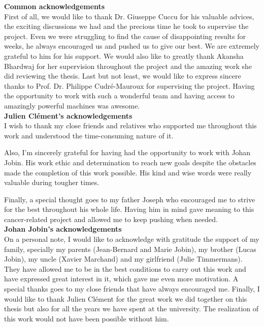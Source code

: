 
\textbf{Common acknowledgements}\\
First of all, we would like to thank Dr. Giuseppe Cuccu for his valuable advices, the exciting discussions we had and the precious time he took to supervise the project. Even we were struggling to find the cause of disappointing results for weeks, he always encouraged us and pushed us to give our best. We are extremely grateful to him for his support. We would also like to greatly thank Akansha Bhardwaj for her supervision throughout the project and the amazing work she did reviewing the thesis. Last but not least, we would like to express sincere thanks to Prof. Dr. Philippe Cudré-Mauroux for supervising the project. Having the opportunity to work with such a wonderful team and having access to amazingly powerful machines was awesome.\\

\noindent \textbf{Julien Clément's acknowledgements}\\
I wish to thank my close friends and relatives who supported me throughout this work and understood the time-consuming nature of it. 

\noindent Also, I’m sincerely grateful for having had the opportunity to work with Johan Jobin. His work ethic and determination to reach new goals despite the obstacles made the completion of this work possible. His kind and wise words were really valuable during tougher times. 

\noindent Finally, a special thought goes to my father Joseph who encouraged me to strive for the best throughout his whole life. Having him in mind gave meaning to this cancer-related project and allowed me to keep pushing when needed.\\

\noindent \textbf{Johan Jobin's acknowledgements}\\
On a personal note, I would like to acknowledge with gratitude the support of my family, specially my parents (Jean-Bernard and Marie Jobin), my brother (Lucas Jobin), my uncle (Xavier Marchand) and my girlfriend (Julie Timmermans). They have allowed me to be in the best conditions to carry out this work and have expressed great interest in it, which gave me even more motivation. A special thanks goes to my close friends that have always encouraged me. Finally, I would like to thank Julien Clément for the great work we did together on this thesis but also for all the years we have spent at the university. The realization of this work would not have been possible without him.